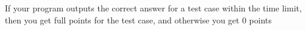 If your program outputs the correct answer for a test case within the time limit, then you
get full points for the test case, and otherwise you get $0$ points